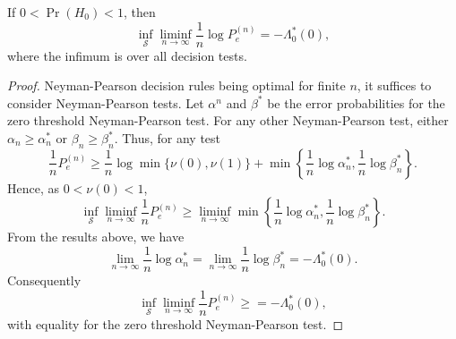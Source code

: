\begin{theorem}[Chernoff]
If $0 < \Pr (H_0) < 1$, then
\begin{equation*}
\inf_{\mathcal{S}} \liminf_{n \rightarrow \infty} \frac{1}{n} \log P_e^{(n)}
= - \Lambda_0^* (0) ,
\end{equation*}
where the infimum is over all decision tests.
\end{theorem}
\begin{proof}
Neyman-Pearson decision rules being optimal for finite $n$, it suffices to consider Neyman-Pearson tests.
Let $\alpha^n$ and $\beta^*$ be the error probabilities for the zero threshold Neyman-Pearson test.
For any other Neyman-Pearson test, either $\alpha_n \geq \alpha_n^*$ or $\beta_n \geq \beta_n^*$.
Thus, for any test
\begin{equation*}
\frac{1}{n} P_e^{(n)} \geq \frac{1}{n} \log \min \{ \nu (0), \nu(1) \}
+ \min \left\{ \frac{1}{n} \log \alpha_n^*, \frac{1}{n} \log \beta_n^* \right\} .
\end{equation*}
Hence, as $0 < \nu(0) < 1$,
\begin{equation*}
\inf_{\mathcal{S}} \liminf_{n \rightarrow \infty}
\frac{1}{n} P_e^{(n)} \geq \liminf_{n \rightarrow \infty}
\min \left\{ \frac{1}{n} \log \alpha_n^*, \frac{1}{n} \log \beta_n^* \right\} .
\end{equation*}
From the results above, we have
\begin{equation*}
\lim_{n \rightarrow \infty} \frac{1}{n} \log \alpha_n^*
= \lim_{n \rightarrow \infty} \frac{1}{n} \log \beta_n^*
= - \Lambda_0^* (0) .
\end{equation*}
Consequently
\begin{equation*}
\inf_{\mathcal{S}} \liminf_{n \rightarrow \infty}
\frac{1}{n} P_e^{(n)} \geq = - \Lambda_0^* (0) ,
\end{equation*}
with equality for the zero threshold Neyman-Pearson test.
\end{proof}

